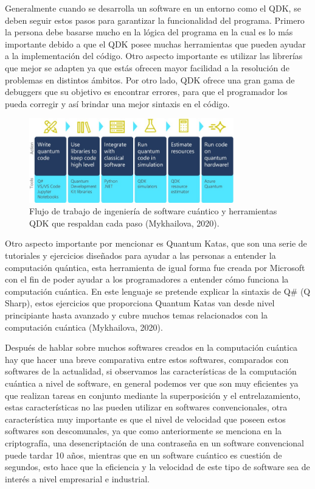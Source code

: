 \documentclass[twoside]{article}
\begin{document}
Generalmente cuando se desarrolla un software en un entorno como el QDK, se deben seguir estos pasos para garantizar la funcionalidad del programa. Primero la persona debe basarse mucho en la lógica del programa en la cual es lo más importante debido a que el QDK posee muchas herramientas que pueden ayudar a la implementación del código. Otro aspecto importante es utilizar las librerías que mejor se adapten ya que estás ofrecen mayor facilidad a la resolución de problemas en distintos ámbitos. Por otro lado, QDK ofrece una gran gama de debuggers que su objetivo es encontrar errores, para que el programador los pueda corregir y así brindar una mejor sintaxis en el código.  


\begin{figure}[htb]
    \centering
    \includegraphics[width=3.5in]{QDK.jpg}
    \caption{Flujo de trabajo de ingeniería de software cuántico y herramientas QDK que respaldan cada paso (Mykhailova, 2020).}
    \label{fig:quantum}
\end{figure}

Otro aspecto importante por mencionar es Quantum Katas, que son una serie de tutoriales y ejercicios diseñados para ayudar a las personas a entender la computación quántica, esta herramienta de igual forma fue creada por Microsoft con el fin de poder ayudar a los programadores a entender cómo funciona la computación cuántica. En este lenguaje se pretende explicar la sintaxis de Q\# (Q Sharp), estos ejercicios que proporciona Quantum Katas van desde nivel principiante hasta avanzado y cubre muchos temas relacionados con la computación cuántica (Mykhailova, 2020).

Después de hablar sobre muchos softwares creados en la computación cuántica hay que hacer una breve comparativa entre estos softwares, comparados con softwares de la actualidad, si observamos las características de la computación cuántica a nivel de software, en general podemos ver que son muy eficientes ya que realizan tareas en conjunto mediante la superposición y el entrelazamiento, estas características no las pueden utilizar en softwares convencionales, otra característica muy importante es que el nivel de velocidad que poseen estos softwares son descomunales, ya que como anteriormente se menciona en la criptografía, una desencriptación de una contraseña en un software convencional puede tardar 10 años, mientras que en un software cuántico es cuestión de segundos, esto hace que la eficiencia y la velocidad de este tipo de software sea de interés a nivel empresarial e industrial. 
\end{document}
